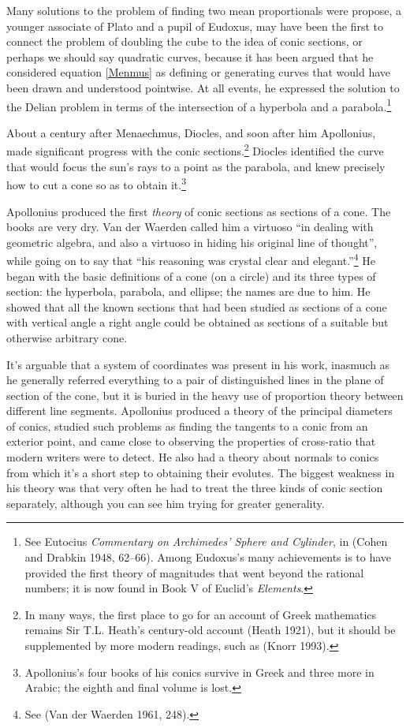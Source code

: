 Many solutions to the problem of finding two mean proportionals were propose, a younger associate of Plato and a pupil of Eudoxus, may have been the first to connect the problem of doubling the cube to the idea of conic sections, or perhaps we should say quadratic curves, because it has been argued that he considered equation \eqref{Menmus} as defining or generating curves that would have been drawn and understood pointwise. At all events, he expressed the solution to the Delian problem in terms of the intersection of a hyperbola and a parabola.\footnote{See Eutocius \emph{Commentary on Archimedes' Sphere and Cylinder}, in (Cohen and Drabkin 1948, 62--66). Among Eudoxus's many achievements is to have provided the first theory of magnitudes that went beyond the rational numbers; it is now found in Book V of Euclid's \emph{Elements}.}

About a century after Menaechmus, Diocles, and soon after him Apollonius, made significant progress with the conic sections.\footnote{In many ways, the first place to go for an account of Greek mathematics remains Sir T.L. Heath's century-old account (Heath 1921), but it should be supplemented by more modern readings, such as (Knorr  1993).}
Diocles identified the curve that would focus the sun's rays to a point as the parabola, and knew precisely how to cut a cone so as to obtain it.\footnote{Apollonius's four books of his conics survive in Greek and three more in Arabic; the eighth and final volume is lost.} 


Apollonius produced the first \emph{theory} of conic sections as sections of a cone. 
The books are very dry. Van der Waerden called him a virtuoso ``in dealing with geometric algebra, and also a virtuoso in hiding his original line of thought'', while going on to say that ``his reasoning was crystal clear and elegant.''\footnote{See (Van der Waerden 1961, 248).}
He began with the basic definitions of a cone (on a circle) and its three types of section: the hyperbola, parabola, and ellipse; the names are due to him. He showed that all the known sections that had been studied as sections of a cone with vertical angle a right angle could be obtained as sections of a suitable but otherwise arbitrary cone.

It's  arguable that a system of coordinates was present in his work, inasmuch as he generally referred everything to a pair of distinguished lines in the plane of section of the cone, but it is buried in the heavy use of proportion theory between different line segments. 
Apollonius produced a theory of the principal diameters of conics, studied such problems as finding the tangents to a conic from an exterior point, and came close to observing the properties of cross-ratio that modern writers were to detect. He also had a theory about normals to conics from which  it's a short step to obtaining their evolutes. 
The biggest weakness in his theory was that very often he had to treat the three kinds of conic section separately, although you can see him trying for greater generality. 




